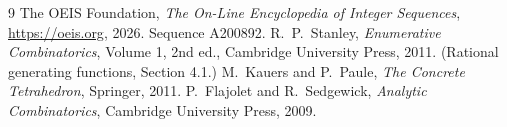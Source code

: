 \documentclass[11pt,a4paper]{article}
\theoremstyle{plain}
\theoremstyle{definition}
\begin{document}
\begin{thebibliography}{9}
 The OEIS Foundation, \emph{The On-Line Encyclopedia of Integer
Sequences}, \url{https://oeis.org}, 2026. Sequence A200892.
 R.~P.~Stanley, \emph{Enumerative Combinatorics}, Volume 1, 2nd ed.,
Cambridge University Press, 2011. (Rational generating functions, Section 4.1.)
 M.~Kauers and P.~Paule, \emph{The Concrete Tetrahedron}, Springer, 2011.
 P.~Flajolet and R.~Sedgewick, \emph{Analytic Combinatorics}, Cambridge
University Press, 2009.
\end{thebibliography}
\end{document}
